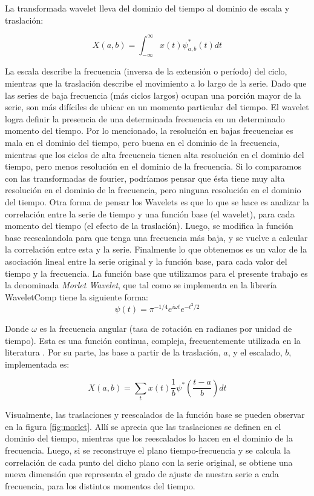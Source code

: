 \documentclass[a4paper]{article}
\begin{document}
La transformada wavelet lleva del dominio del tiempo al dominio de escala y traslación:

$$
X(a,b)=\int_{-\infty}^{\infty} x(t) \psi^*_{a,b}(t)dt
$$

La escala describe la frecuencia (inversa de la extensión o período) del ciclo, mientras que la traslación describe el movimiento a lo largo de la serie. Dado que las series de baja frecuencia (más ciclos largos) ocupan una porción mayor de la serie, son más difíciles de ubicar en un momento particular del tiempo. El wavelet logra definir la presencia de una determinada frecuencia en un determinado momento del tiempo. Por lo mencionado, la resolución en bajas frecuencias es mala en el dominio del tiempo, pero buena en el dominio de la frecuencia, mientras que los ciclos de alta frecuencia tienen alta resolución en el dominio del tiempo, pero menos resolución en el dominio de la frecuencia. Si lo comparamos con las transformadas de fourier, podríamos pensar que ésta tiene muy alta resolución en el dominio de la frecuencia, pero ninguna resolución en el dominio del tiempo. 
Otra forma de pensar los Wavelets es que lo que se hace es analizar la correlación entre la serie de tiempo y una función base (el wavelet), para cada momento del tiempo (el efecto de la traslación). Luego, se modifica la función base reescalandola para que tenga una frecuencia más baja, y se vuelve a calcular la correlación entre esta y la serie. Finalmente lo que obtenemos es un valor de la asociación lineal entre la serie original y la función base, para cada valor del tiempo y la frecuencia.  
La función base que utilizamos para el presente trabajo es la denominada \textit{Morlet Wavelet}, que tal como se implementa en la librería WaveletComp \citep{Roesch2018} tiene la siguiente forma:
$$
\psi(t)=\pi^{-1/4}e^{i\omega t}e^{-t^2/2}
$$

Donde $\omega$ es la frecuencia angular (tasa de rotación en radianes por unidad de tiempo). Esta es una función continua, compleja, frecuentemente utilizada en la literatura \citep{conraria2011continuous}. Por su parte, las base a partir de la traslación, $a$, y el escalado, $b$, implementada es:

$$
X(a,b)=\sum_{t} x(t)   \frac{1}{b} \psi^*(\frac{t-a}{b})dt
$$

Visualmente, las traslaciones y reescalados de la función base se pueden observar en la figura \ref{fig:morlet}. Allí se aprecia que las traslaciones se definen en el dominio del tiempo, mientras que los reescalados lo hacen en el dominio de la frecuencia. Luego, si se reconstruye el plano tiempo-frecuencia y se calcula la correlación de cada punto del dicho plano con la serie original, se obtiene una nueva dimensión que representa el grado de ajuste de nuestra serie a cada frecuencia, para los distintos momentos del tiempo. 
\end{document}

